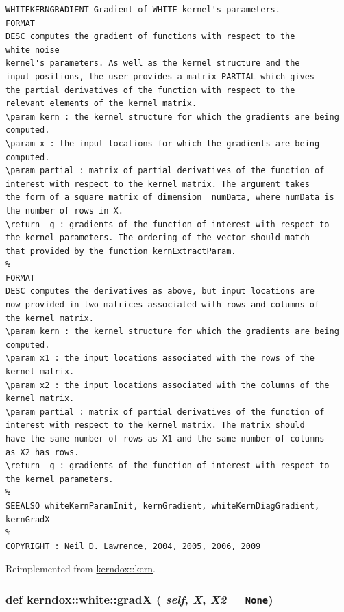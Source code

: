 \footnotesize\begin{verbatim}WHITEKERNGRADIENT Gradient of WHITE kernel's parameters.
FORMAT
DESC computes the gradient of functions with respect to the
white noise
kernel's parameters. As well as the kernel structure and the
input positions, the user provides a matrix PARTIAL which gives
the partial derivatives of the function with respect to the
relevant elements of the kernel matrix. 
\param kern : the kernel structure for which the gradients are being
computed.
\param x : the input locations for which the gradients are being
computed. 
\param partial : matrix of partial derivatives of the function of
interest with respect to the kernel matrix. The argument takes
the form of a square matrix of dimension  numData, where numData is
the number of rows in X.
\return  g : gradients of the function of interest with respect to
the kernel parameters. The ordering of the vector should match
that provided by the function kernExtractParam.
%
FORMAT
DESC computes the derivatives as above, but input locations are
now provided in two matrices associated with rows and columns of
the kernel matrix. 
\param kern : the kernel structure for which the gradients are being
computed.
\param x1 : the input locations associated with the rows of the
kernel matrix.
\param x2 : the input locations associated with the columns of the
kernel matrix.
\param partial : matrix of partial derivatives of the function of
interest with respect to the kernel matrix. The matrix should
have the same number of rows as X1 and the same number of columns
as X2 has rows.
\return  g : gradients of the function of interest with respect to
the kernel parameters.
%
SEEALSO whiteKernParamInit, kernGradient, whiteKernDiagGradient, kernGradX
%
COPYRIGHT : Neil D. Lawrence, 2004, 2005, 2006, 2009

\end{verbatim}
\normalsize
 

Reimplemented from \hyperlink{classkerndox_1_1kern}{kerndox::kern}.\hypertarget{classkerndox_1_1white_b03d95c89f8e460fe5b1e8a97661e15c}{
\subsubsection[{gradX}]{\setlength{\rightskip}{0pt plus 5cm}def kerndox::white::gradX ( {\em self}, \/   {\em X}, \/   {\em X2} = {\tt None})}}
\label{classkerndox_1_1white_b03d95c89f8e460fe5b1e8a97661e15c}




